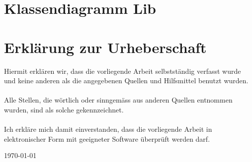 \documentclass[a4paper,12pt]{report}
\begin{document}
    \vspace*{\fill}
    

    \vspace*{\fill}
    \thispagestyle{empty}
    \titleformat{\section}{\centering\normalfont\Large\bfseries}{\thesection}{1em}{}


    \section{Klassendiagramm Lib}
    \label{sec:class-diag-lib}

    \begingroup
    \renewcommand{\thefootnote}{\roman{footnote}}
    \endgroup

    \vspace*{\fill}
    


    \section{Erklärung zur Urheberschaft}

    Hiermit erklären wir, dass die vorliegende Arbeit selbstständig verfasst wurde und keine anderen als die angegebenen Quellen und Hilfsmittel benutzt wurden.
    \\\\
    Alle Stellen, die wörtlich oder sinngemäss aus anderen Quellen entnommen wurden, sind als solche gekennzeichnet.
    \\\\
    Ich erkläre mich damit einverstanden, dass die vorliegende Arbeit in elektronischer Form mit geeigneter Software überprüft werden darf.

    \begin{flushleft}
        \today
    \end{flushleft}
\end{document}
